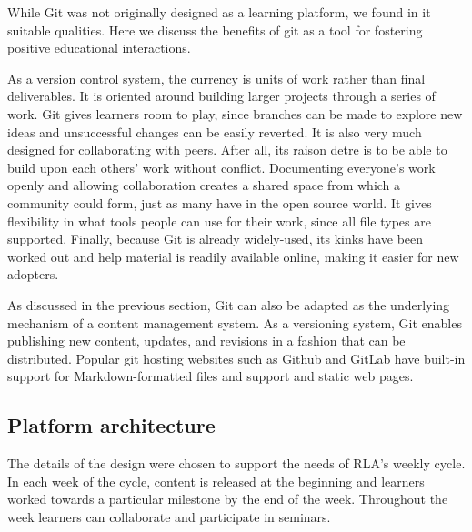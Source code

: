 \documentclass[12pt,twoside,vi]{mitthesis}
\begin{document}
While Git was not originally designed as a learning platform, we found in it suitable qualities. Here we discuss the benefits of git as a tool for fostering positive educational interactions.

As a version control system, the currency is units of work rather than final deliverables. It is oriented around building larger projects through a series of work. Git gives learners room to play, since branches can be made to explore new ideas and unsuccessful changes can be easily reverted. It is also very much designed for collaborating with peers. After all, its raison detre is to be able to build upon each others' work without conflict. Documenting everyone's work openly and allowing collaboration creates a shared space from which a community could form, just as many have in the open source world. It gives flexibility in what tools people can use for their work, since all file types are supported. Finally, because Git is already widely-used, its kinks have been worked out and help material is readily available online, making it easier for new adopters.

As discussed in the previous section, Git can also be adapted as the underlying mechanism of a content management system. As a versioning system, Git enables publishing new content, updates, and revisions in a fashion that can be distributed. Popular git hosting websites such as Github and GitLab have built-in support for Markdown-formatted files and support and static web pages.

\subsection{Platform architecture}

The details of the design were chosen to support the needs of RLA's weekly cycle. In each week of the cycle, content is released at the beginning and learners worked towards a particular milestone by the end of the week. Throughout the week learners can collaborate and participate in seminars.
\end{document}
